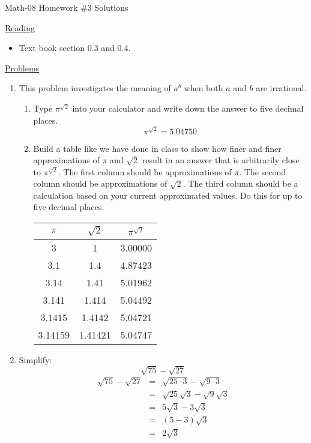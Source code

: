 \documentclass[letterpaper,12pt,fleqn]{article}
\begin{document}
\begin{center}
\Large Math-08 Homework \#3 Solutions
\end{center}

\vspace{0.5in}

\underline{Reading}

\begin{itemize}
\item Text book section 0.3 and 0.4.
\end{itemize}

\underline{Problems}

\begin{enumerate}
\item This problem investigates the meaning of $a^b$ when both $a$ and $b$ are
  irrational.
  \begin{enumerate}
  \item Type $\pi^{\sqrt{2}}$ into your calculator and write down the answer
    to five decimal places.
    \[\pi^{\sqrt{2}}=5.04750\]
    
  \item Build a table like we have done in class to show how finer and finer
    approximations of $\pi$ and $\sqrt{2}$ result in an answer that is
    arbitrarily close to $\pi^{\sqrt{2}}$. The first column should be
    approximations of $\pi$. The second column should be approximations of
    $\sqrt{2}$. The third column should be a calculation based on your current
    approximated values. Do this for up to five decimal places.

    \begin{tabular}{cc|c}
      $\pi$ & $\sqrt{2}$ & $\pi^{\sqrt{2}}$ \\
      \hline
      3 & 1 & 3.00000 \\
      3.1 & 1.4 & 4.87423 \\
      3.14 & 1.41 & 5.01962 \\
      3.141 & 1.414 & 5.04492 \\
      3.1415 & 1.4142 & 5.04721 \\
      3.14159 & 1.41421 & 5.04747 \\
    \end{tabular}
    
  \end{enumerate}

\item Simplify:
  \[\sqrt{75}-\sqrt{27}\]
  \begin{eqnarray*}
    \sqrt{75}-\sqrt{27} &=& \sqrt{25\cdot3}-\sqrt{9\cdot3} \\
    &=& \sqrt{25}\sqrt{3}-\sqrt{9}\sqrt{3} \\
    &=& 5\sqrt{3}-3\sqrt{3} \\
    &=& (5-3)\sqrt{3} \\
    &=& 2\sqrt{3} \\
  \end{eqnarray*}


\end{enumerate}
\end{document}
